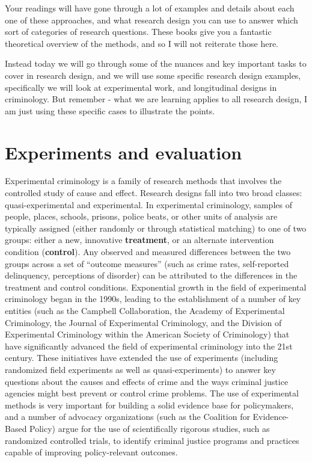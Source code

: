 \documentclass[
]{book}
\begin{document}
Your readings will have gone through a lot of examples and details about each one of these approaches, and what research design you can use to answer which sort of categories of research questions. These books give you a fantastic theoretical overview of the methods, and so I will not reiterate those here.

Instead today we will go through some of the nuances and key important tasks to cover in research design, and we will use some specific research design examples, specifically we will look at experimental work, and longitudinal designs in criminology. But remember - what we are learning applies to all research design, I am just using these specific cases to illustrate the points.

\hypertarget{experiments-and-evaluation}{%
\section{Experiments and evaluation}\label{experiments-and-evaluation}}

Experimental criminology is a family of research methods that involves the controlled study of cause and effect. Research designs fall into two broad classes: quasi-experimental and experimental. In experimental criminology, samples of people, places, schools, prisons, police beats, or other units of analysis are typically assigned (either randomly or through statistical matching) to one of two groups: either a new, innovative \textbf{treatment}, or an alternate intervention condition (\textbf{control}). Any observed and measured differences between the two groups across a set of ``outcome measures'' (such as crime rates, self-reported delinquency, perceptions of disorder) can be attributed to the differences in the treatment and control conditions. Exponential growth in the field of experimental criminology began in the 1990s, leading to the establishment of a number of key entities (such as the Campbell Collaboration, the Academy of Experimental Criminology, the Journal of Experimental Criminology, and the Division of Experimental Criminology within the American Society of Criminology) that have significantly advanced the field of experimental criminology into the 21st century. These initiatives have extended the use of experiments (including randomized field experiments as well as quasi-experiments) to answer key questions about the causes and effects of crime and the ways criminal justice agencies might best prevent or control crime problems. The use of experimental methods is very important for building a solid evidence base for policymakers, and a number of advocacy organizations (such as the Coalition for Evidence- Based Policy) argue for the use of scientifically rigorous studies, such as randomized controlled trials, to identify criminal justice programs and practices capable of improving policy-relevant outcomes.
\end{document}
